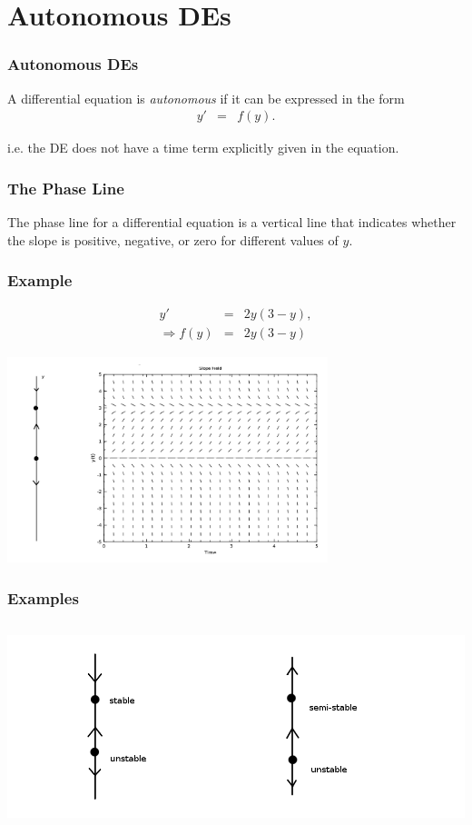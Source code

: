 \documentclass{beamer}
\begin{document}
\section{Autonomous DEs}

\begin{frame}
  \frametitle{Autonomous DEs}

  A differential equation is \textit{autonomous} if it can be
  expressed in the form
  \begin{eqnarray*}
    y' & = & f(y).
  \end{eqnarray*}

  i.e. the DE does not have a time term explicitly given in the
  equation.


\end{frame}


\begin{frame}
  \frametitle{The Phase Line}

  The phase line for a differential equation is a vertical line that
  indicates whether the slope is positive, negative, or zero for
  different values of $y$.
\end{frame}

\begin{frame}
  \frametitle{Example}
  \begin{eqnarray*}
    y' & = & 2y(3-y), \\
    \Rightarrow f(y) & = & 2y(3-y)
  \end{eqnarray*}


  \includegraphics[height=6cm]{week3PhaseLineExample1}

\end{frame}


\begin{frame}
  \frametitle{Examples}
  
  \includegraphics[height=6cm]{week3PhaseLine}

\end{frame}
\end{document}
